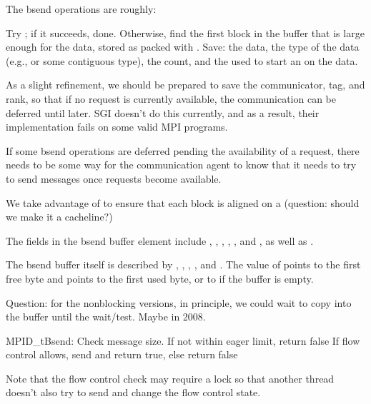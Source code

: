 \documentclass{article}
\begin{document}
The bsend operations are roughly:
\begin{adi3}
Try ; if it succeeds, done.
Otherwise, find the first block in the buffer that is large enough for
the data, stored as packed with .  
Save: the data, the type of the data (e.g.,  or some
contiguous type), the count, and the  used to start
an  on the data.

As a slight refinement, we should be prepared to save the
communicator, tag, and rank, so that if no request is currently
available, the communication can be deferred until later.  SGI doesn't
do this currently, and as a result, their implementation fails on some
valid MPI programs.

If some bsend operations are deferred pending the availability of a
request, there needs to be some way for the communication agent to
know that it needs to try to send messages once requests become
available.

\end{adi3}
We take advantage of  to ensure that each
block is aligned on a  (question: should we make it a
cacheline?)

The fields in the bsend buffer element include
,
,
,
,
, and 
, as well as .

The bsend buffer itself is described by
, ,
, , and
.  The value of  points
to the first free byte and  points to the first used byte,
or to  if the buffer is empty.

Question: for the nonblocking versions, in principle, we could wait to
copy into the buffer until the wait/test.  Maybe in 2008.

\begin{mmadi}
MPID_tBsend:
Check message size.  
If not within eager limit, return false
If flow control allows, send and return true, 
else return false

Note that the flow control check may require a lock so that another
thread doesn't also try to send and change the flow control state.
\end{mmadi}
\end{document}
